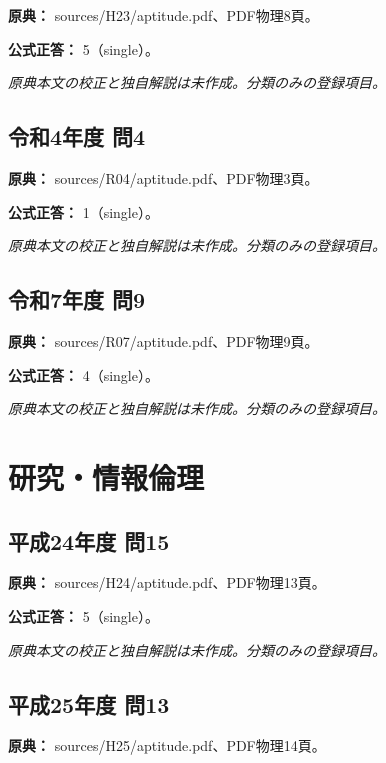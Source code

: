 \noindent\textbf{原典：} sources/H23/aptitude.pdf、PDF物理8頁。

\textbf{公式正答：} 5（single）。

\par\textit{原典本文の校正と独自解説は未作成。分類のみの登録項目。}

\subsection{令和4年度 問4}
\label{q:r04-reg-apt-04}

\noindent\textbf{原典：} sources/R04/aptitude.pdf、PDF物理3頁。

\textbf{公式正答：} 1（single）。

\par\textit{原典本文の校正と独自解説は未作成。分類のみの登録項目。}

\subsection{令和7年度 問9}
\label{q:r07-reg-apt-09}

\noindent\textbf{原典：} sources/R07/aptitude.pdf、PDF物理9頁。

\textbf{公式正答：} 4（single）。

\par\textit{原典本文の校正と独自解説は未作成。分類のみの登録項目。}

\section{研究・情報倫理}

\subsection{平成24年度 問15}
\label{q:h24-reg-apt-15}

\noindent\textbf{原典：} sources/H24/aptitude.pdf、PDF物理13頁。

\textbf{公式正答：} 5（single）。

\par\textit{原典本文の校正と独自解説は未作成。分類のみの登録項目。}

\subsection{平成25年度 問13}
\label{q:h25-reg-apt-13}

\noindent\textbf{原典：} sources/H25/aptitude.pdf、PDF物理14頁。

